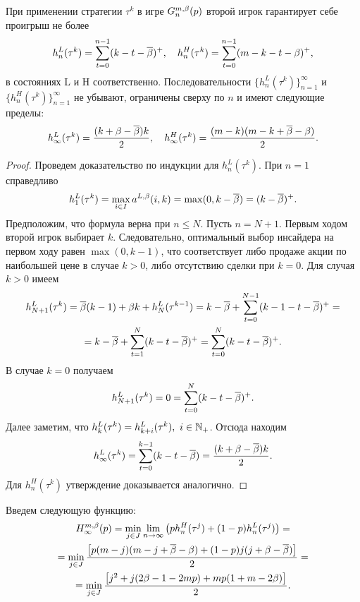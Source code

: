 {\begin{proposition}
  \label{ch1:prop:secondPlayerStrategyPayoffs}
  При применении стратегии $\tau^k$ в игре $\theG*{n}(p)$ второй игрок гарантирует себе проигрыш не более
  \[
    h_n^L(\tau^k) = \sum_{t=0}^{n-1}(k - t - {{\overline{\beta}}})^+, \quad h_n^H(\tau^k) =
    \sum_{t=0}^{n-1}(m - k - t - \beta)^+,
  \]
  в состояниях L и H соответственно.
  Последовательности $\{h_n^L(\tau^k)\}_{n=1}^\infty$ и $\{h_n^H(\tau^k)\}_{n=1}^\infty$ не убывают, ограничены сверху по $n$ и имеют следующие пределы:
  \begin{equation*}
    h_\infty^L(\tau^k) = \frac{(k+\beta-{{\overline{\beta}}})k}{2},\quad
    h_\infty^H(\tau^k) = \frac{(m - k)(m - k + {{\overline{\beta}}} - \beta)}{2}.
  \end{equation*}
\end{proposition}
\begin{proof}
  Проведем доказательство по индукции для $h^L_n(\tau^k)$.
  При $n=1$ справедливо
  \[
    h^L_1(\tau^k) = \max_{i \in I} \as[L](i, k) = \max(0, k - \DCo) = (k - \DCo)^+.
  \]
  Предположим, что формула верна при $n \leq N$.
  Пусть $n=N+1$.
  Первым ходом второй игрок выбирает $k$.
  Следовательно, оптимальный выбор инсайдера на первом ходу равен $\max(0, k - 1)$, что соответствует либо продаже акции по наибольшей цене в случае $k > 0$, либо отсутствию сделки при $k=0$. 
  Для случая $k > 0$ имеем
  \begin{gather*}
    h^L_{N+1}(\tau^k) = {{\overline{\beta}}} (k-1) + \beta k + h^L_N(\tau^{k-1}) =
    k - {{\overline{\beta}}} + \sum_{t=0}^{N-1}(k - 1 - t - {{\overline{\beta}}})^+ = \\
    = k - {{\overline{\beta}}} + \sum_{t=1}^N(k-t-{{\overline{\beta}}})^+ = \sum_{t=0}^N(k-t-{{\overline{\beta}}})^+.
  \end{gather*}
  В случае $k = 0$ получаем
  \begin{gather*}
    h^L_{N+1}(\tau^k) = 0 = \sum_{t=0}^N(k-t-{{\overline{\beta}}})^+.
  \end{gather*}
  Далее заметим, что $h^L_k(\tau^k) = h^L_{k+i}(\tau^k),\ i \in \mathbb{N}_+$.
  Отсюда находим
  \begin{equation*}
    h_\infty^L(\tau^k) = \sum_{t=0}^{k-1} (k - t - {{\overline{\beta}}}) = \frac{(k+\beta-{{\overline{\beta}}})k}{2}.
  \end{equation*}
  Для $h^H_n(\tau^k)$ утверждение доказывается аналогично.
\end{proof}

Введем следующую функцию:
\begin{multline*}
  \H*{\infty}(p) 
  = \min_{j \in J} \lim_{n \rightarrow \infty}\left(
    ph_n^H(\tau^j) + (1-p)h_n^L(\tau^j)
  \right) = \\
  = \min_{j \in J} \frac{\left[ p (m - j)(m - j + \DCo - \Co) + (1 - p)j(j + \Co - \DCo) \right]}{2} = \\
  = \min_{j \in J} \frac{\left[ j^2 + j(2\Co - 1 - 2 m p) + m p (1 + m - 2\Co) \right]}{2}.
\end{multline*}

}
